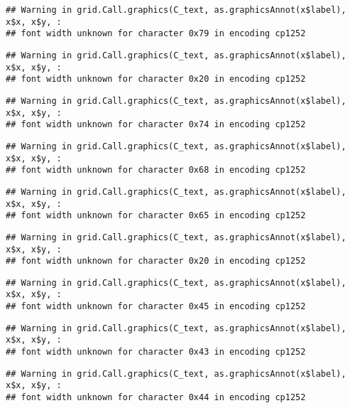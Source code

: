 \documentclass[
]{article}
\begin{document}
\begin{verbatim}
## Warning in grid.Call.graphics(C_text, as.graphicsAnnot(x$label), x$x, x$y, :
## font width unknown for character 0x79 in encoding cp1252
\end{verbatim}

\begin{verbatim}
## Warning in grid.Call.graphics(C_text, as.graphicsAnnot(x$label), x$x, x$y, :
## font width unknown for character 0x20 in encoding cp1252
\end{verbatim}

\begin{verbatim}
## Warning in grid.Call.graphics(C_text, as.graphicsAnnot(x$label), x$x, x$y, :
## font width unknown for character 0x74 in encoding cp1252
\end{verbatim}

\begin{verbatim}
## Warning in grid.Call.graphics(C_text, as.graphicsAnnot(x$label), x$x, x$y, :
## font width unknown for character 0x68 in encoding cp1252
\end{verbatim}

\begin{verbatim}
## Warning in grid.Call.graphics(C_text, as.graphicsAnnot(x$label), x$x, x$y, :
## font width unknown for character 0x65 in encoding cp1252
\end{verbatim}

\begin{verbatim}
## Warning in grid.Call.graphics(C_text, as.graphicsAnnot(x$label), x$x, x$y, :
## font width unknown for character 0x20 in encoding cp1252
\end{verbatim}

\begin{verbatim}
## Warning in grid.Call.graphics(C_text, as.graphicsAnnot(x$label), x$x, x$y, :
## font width unknown for character 0x45 in encoding cp1252
\end{verbatim}

\begin{verbatim}
## Warning in grid.Call.graphics(C_text, as.graphicsAnnot(x$label), x$x, x$y, :
## font width unknown for character 0x43 in encoding cp1252
\end{verbatim}

\begin{verbatim}
## Warning in grid.Call.graphics(C_text, as.graphicsAnnot(x$label), x$x, x$y, :
## font width unknown for character 0x44 in encoding cp1252
\end{verbatim}
\end{document}
